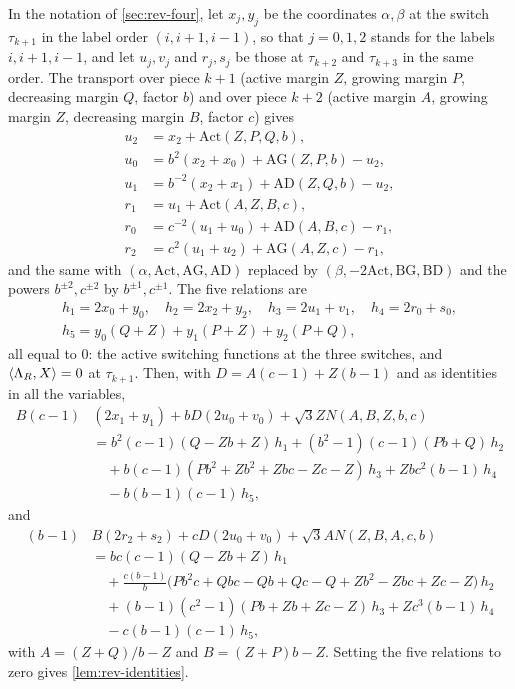 In the notation of \cref{sec:rev-four}, let $x_j,y_j$ be the coordinates $\alpha,\beta$ at the
switch $\tau_{k+1}$ in the label order $(i,i+1,i-1)$, so that $j=0,1,2$ stands for the labels
$i,i+1,i-1$, and let $u_j,v_j$ and $r_j,s_j$ be those at $\tau_{k+2}$ and $\tau_{k+3}$ in the same
order. The transport over piece $k+1$ (active margin $Z$, growing margin $P$, decreasing margin
$Q$, factor $b$) and over piece $k+2$ (active margin $A$, growing margin $Z$, decreasing margin
$B$, factor $c$) gives
\begin{align*}
  u_2&=x_2+\mathrm{Act}(Z,P,Q,b),\\
  u_0&=b^2(x_2+x_0)+\mathrm{AG}(Z,P,b)-u_2,\\
  u_1&=b^{-2}(x_2+x_1)+\mathrm{AD}(Z,Q,b)-u_2,\\
  r_1&=u_1+\mathrm{Act}(A,Z,B,c),\\
  r_0&=c^{-2}(u_1+u_0)+\mathrm{AD}(A,B,c)-r_1,\\
  r_2&=c^2(u_1+u_2)+\mathrm{AG}(A,Z,c)-r_1,
\end{align*}
and the same with $(\alpha,\mathrm{Act},\mathrm{AG},\mathrm{AD})$ replaced by
$(\beta,-2\mathrm{Act},\mathrm{BG},\mathrm{BD})$ and the powers $b^{\pm2},c^{\pm2}$ by
$b^{\pm1},c^{\pm1}$. The five relations are
\begin{gather*}
  h_1=2x_0+y_0,\quad h_2=2x_2+y_2,\quad h_3=2u_1+v_1,\quad h_4=2r_0+s_0,\\
  h_5=y_0(Q+Z)+y_1(P+Z)+y_2(P+Q),
\end{gather*}
all equal to $0$: the active switching functions at the three switches, and
$\langle \Lambda_R,X\rangle=0$ at $\tau_{k+1}$. Then, with $D=A(c-1)+Z(b-1)$ and as identities in all the
variables,
\begin{align*}
  B(c-1)&(2x_1+y_1)+bD(2u_0+v_0)+\sqrt3ZN(A,B,Z,b,c)\\
  &=b^2(c-1)(Q-Zb+Z)\,h_1+(b^2-1)(c-1)(Pb+Q)\,h_2\\
  &\quad+b(c-1)(Pb^2+Zb^2+Zbc-Zc-Z)\,h_3+Zbc^2(b-1)\,h_4\\
  &\quad-b(b-1)(c-1)\,h_5,
\end{align*}
and
\begin{align*}
  (b-1)&B(2r_2+s_2)+cD(2u_0+v_0)+\sqrt3AN(Z,B,A,c,b)\\
  &=bc(c-1)(Q-Zb+Z)\,h_1\\
  &\quad+\tfrac{c(b-1)}{b}\bigl(Pb^2c+Qbc-Qb+Qc-Q+Zb^2-Zbc+Zc-Z\bigr)\,h_2\\
  &\quad+(b-1)(c^2-1)(Pb+Zb+Zc-Z)\,h_3+Zc^3(b-1)\,h_4\\
  &\quad-c(b-1)(c-1)\,h_5,
\end{align*}
with $A=(Z+Q)/b-Z$ and $B=(Z+P)b-Z$. Setting the five
relations to zero gives \cref{lem:rev-identities}.

